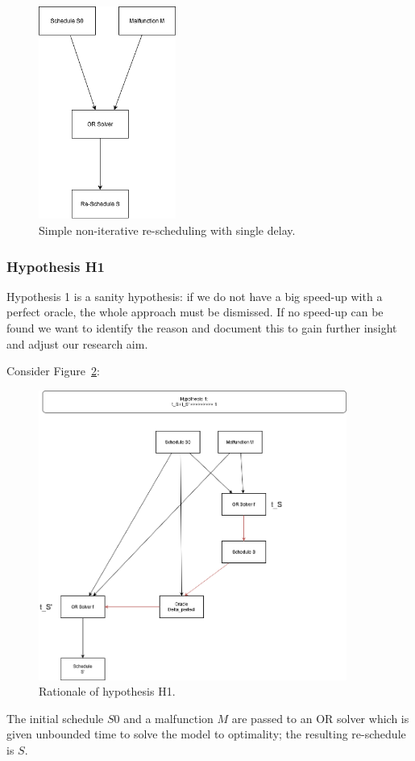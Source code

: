 \documentclass{article}
\begin{document}
\begin{figure}[hbtp]
	\centering
  \includegraphics[width=0.4\textwidth]{introduction_no_loop.png}
	\caption{Simple non-iterative re-scheduling with single delay.}
	\label{fig:introduction_no_loop}
\end{figure}





\subsubsection{Hypothesis H1}\label{subec:H1}

Hypothesis 1 is a sanity hypothesis: if we do not have a big speed-up with a perfect oracle, the whole approach must be dismissed. If no speed-up can be found we want to identify the reason and document this to gain further insight and adjust our research aim.

Consider Figure~\ref{fig:introduction_H1}:
%
\begin{figure}[hbtp]
	\centering
  \includegraphics[width=0.9\textwidth]{introduction_H1.png}
	\caption{Rationale of hypothesis H1.}
	\label{fig:introduction_H1}
\end{figure}
%
The initial schedule $S0$ and a malfunction $M$ are passed to an OR solver which is given unbounded time to solve the model to optimality; the resulting re-schedule is $S$.
\end{document}
